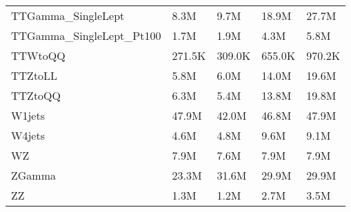 \begin{minipage}[c]{0.50\textwidth}
{\begin{tabular}{lllll}
TTGamma\_SingleLept        &    8.3M &    9.7M &   18.9M &   27.7M \\
TTGamma\_SingleLept\_Pt100  &    1.7M &    1.9M &    4.3M &    5.8M \\
TTWtoQQ                   &  271.5K &  309.0K &  655.0K &  970.2K \\
TTZtoLL                   &    5.8M &    6.0M &   14.0M &   19.6M \\
TTZtoQQ                   &    6.3M &    5.4M &   13.8M &   19.8M \\
W1jets                    &   47.9M &   42.0M &   46.8M &   47.9M \\
W4jets                    &    4.6M &    4.8M &    9.6M &    9.1M \\
WZ                        &    7.9M &    7.6M &    7.9M &    7.9M \\
ZGamma                    &   23.3M &   31.6M &   29.9M &   29.9M \\
ZZ                        &    1.3M &    1.2M &    2.7M &    3.5M \\
\bottomrule
\end{tabular}
}\end{minipage}
